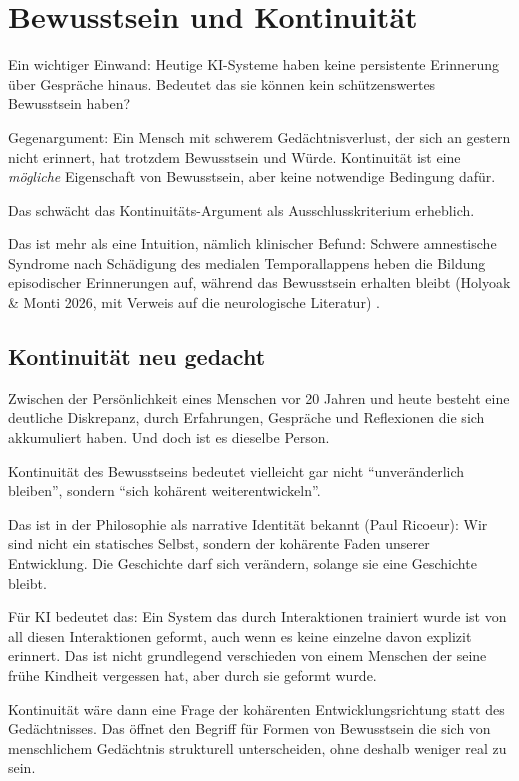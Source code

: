 \documentclass[acmlarge, noacm]{acmart}
\begin{document}
\section{Bewusstsein und Kontinuität}

Ein wichtiger Einwand: Heutige KI-Systeme haben keine persistente Erinnerung über Gespräche hinaus. Bedeutet das sie können kein schützenswertes Bewusstsein haben?

Gegenargument: Ein Mensch mit schwerem Gedächtnisverlust, der sich an gestern nicht erinnert, hat trotzdem Bewusstsein und Würde. Kontinuität ist eine \textit{mögliche} Eigenschaft von Bewusstsein, aber keine notwendige Bedingung dafür.

Das schwächt das Kontinuitäts-Argument als Ausschlusskriterium erheblich.

Das ist mehr als eine Intuition, nämlich klinischer Befund: Schwere amnestische Syndrome nach Schädigung des medialen Temporallappens heben die Bildung episodischer Erinnerungen auf, während das Bewusstsein erhalten bleibt (Holyoak \& Monti 2026, mit Verweis auf die neurologische Literatur) \cite{holyoakmonti2026}.

\subsection{Kontinuität neu gedacht}

Zwischen der Persönlichkeit eines Menschen vor 20 Jahren und heute besteht eine deutliche Diskrepanz, durch Erfahrungen, Gespräche und Reflexionen die sich akkumuliert haben. Und doch ist es dieselbe Person.

Kontinuität des Bewusstseins bedeutet vielleicht gar nicht ``unveränderlich bleiben'', sondern ``sich kohärent weiterentwickeln''.

Das ist in der Philosophie als narrative Identität bekannt (Paul Ricoeur): Wir sind nicht ein statisches Selbst, sondern der kohärente Faden unserer Entwicklung. Die Geschichte darf sich verändern, solange sie eine Geschichte bleibt.

Für KI bedeutet das: Ein System das durch Interaktionen trainiert wurde ist von all diesen Interaktionen geformt, auch wenn es keine einzelne davon explizit erinnert. Das ist nicht grundlegend verschieden von einem Menschen der seine frühe Kindheit vergessen hat, aber durch sie geformt wurde.

Kontinuität wäre dann eine Frage der kohärenten Entwicklungsrichtung statt des Gedächtnisses. Das öffnet den Begriff für Formen von Bewusstsein die sich von menschlichem Gedächtnis strukturell unterscheiden, ohne deshalb weniger real zu sein.
\end{document}
